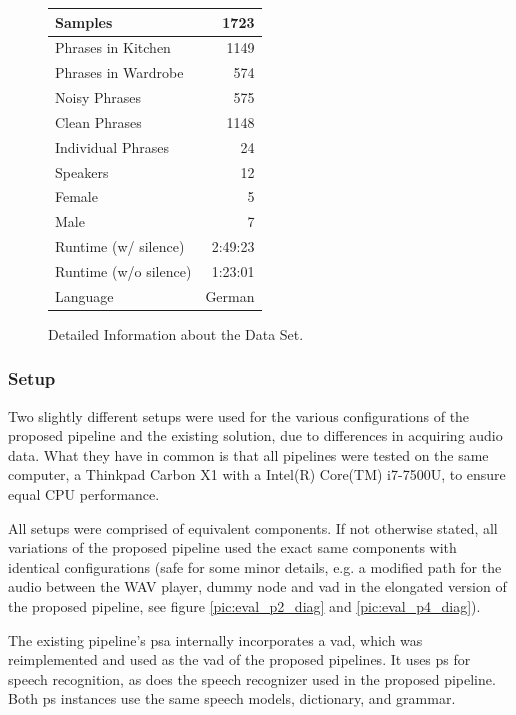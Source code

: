 \begin{figure}[]
	\centering
	\begin{tabular}{| l | r |}
		\hline
		Samples 				& 1723	 	\\ \hline
		Phrases	in Kitchen		& 1149		\\ \hline
		Phrases	in Wardrobe		& 574		\\ \hline
		Noisy Phrases			& 575		\\ \hline
		Clean Phrases			& 1148		\\ \hline
		Individual Phrases		& 24 		\\ \hline
		Speakers 				& 12	 	\\ \hline
		Female					& 5 		\\ \hline
		Male	 				& 7			\\ \hline
		Runtime (w/ silence) 	& 2:49:23	\\ \hline
		Runtime (w/o silence) 	& 1:23:01	\\ \hline
		Language 				& German	\\ \hline
	\end{tabular}
	\caption{Detailed Information about the Data Set.}
	\label{table:eval_dataset_info}
\end{figure}

\subsubsection{Setup}
\label{eval:dataset:setup}

Two slightly different setups were used for the various configurations of the proposed pipeline and the existing solution, due to differences in acquiring audio data.
What they have in common is that all pipelines were tested on the same computer, a Thinkpad Carbon X1 with a Intel(R) Core(TM) i7-7500U, to ensure equal CPU performance.

All setups were comprised of equivalent components. 
If not otherwise stated, all variations of the proposed pipeline used the exact same components with identical configurations (safe for some minor details, e.g. a modified path for the audio between the WAV player, dummy node and \gls{vad} in the elongated version of the proposed pipeline, see figure \ref{pic:eval_p2_diag} and \ref{pic:eval_p4_diag}).

The existing pipeline's \gls{psa} internally incorporates a \gls{vad}, which was reimplemented and used as the \gls{vad} of the proposed pipelines.
It uses \gls{ps} for speech recognition, as does the speech recognizer used in the proposed pipeline. 
Both \gls{ps} instances use the same speech models, dictionary, and grammar.

